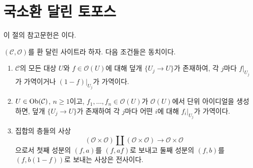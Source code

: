 \section{국소환 달린 토포스}
\label{section-locally-ringed}


\noindent
이 절의 참고문헌은
\cite[Expos\'e IV, Exercice 13.9]{SGA4}이다.

\begin{lemma}
\label{lemma-locally-ringed}
$(\mathcal{C}, \mathcal{O})$를 환 달린 사이트라 하자. 다음 조건들은 동치이다.
\begin{enumerate}
\item $\mathcal{C}$의 모든 대상 $U$와 $f \in \mathcal{O}(U)$에 대해
덮개 $\{U_j \to U\}$가 존재하여, 각 $j$마다 $f|_{U_j}$가 가역이거나
$(1 - f)|_{U_j}$가 가역이다.
\item $U \in \mathop{\mathrm{Ob}}\nolimits(\mathcal{C})$, $n \geq 1$이고,
$f_1, \ldots, f_n \in \mathcal{O}(U)$가 $\mathcal{O}(U)$에서 단위
아이디얼을 생성하면, 덮개 $\{U_j \to U\}$가 존재하여 각 $j$마다
어떤 $i$에 대해 $f_i|_{U_j}$가 가역이다.
\item 집합의 층들의 사상
$$
(\mathcal{O} \times \mathcal{O})
\amalg
(\mathcal{O} \times \mathcal{O})
\longrightarrow
\mathcal{O} \times \mathcal{O}
$$
으로서 첫째 성분의 $(f, a)$를 $(f, af)$로 보내고 둘째 성분의
$(f, b)$를 $(f, b(1 - f))$로 보내는 사상은 전사이다.
\end{enumerate}
\end{lemma}

